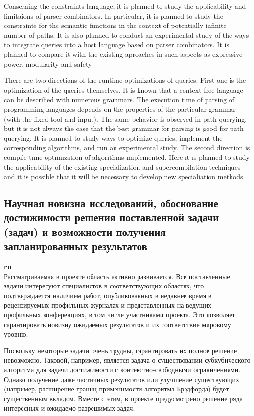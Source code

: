 \documentclass[12pt]{article}  %
\theoremstyle{remark}
\begin{document}
Conserning the constraints language, it is planned to study the applicability and limitaions of parser combinators.
In particular, it is planned to study the constraints for the semantic functions in the context of potentially infinite number of paths.
It is also planned to conduct an experimental study of the ways to integrate queries into a host language  based on parser combinators.
It is planned to compare it with the existing aproaches in such aspects as expressive power, modularity and safety.

There are two directions of the runtime optimizations of queries.
First one is the optimization of the queries themselves.
It is known that a context free language can be described with numerous grammars.
The execution time of parsing of programming languages depends on the properties of the particular grammar (with the fixed tool and input).
The same behavior is observed in path querying, but it is not always the case that the best grammar for parsing is good for path querying.
It is planned to study ways to optimize queries, implement the corresponding algorithms, and run an experimental study.
The second direction is compile-time optimization of algorithms implemented.
Here it is planned to study the applicability of the existing specialization and supercompilation techniques and it is possible that it will be necessary to develop new specialiation methods.


\subsection{Научная новизна исследований, обоснование достижимости решения поставленной задачи (задач) и возможности получения запланированных результатов}

\textbf{ru}\\
%
Рассматриваемая в проекте область активно развивается. Все поставленные задачи интересуют специалистов в соответствующих областях, что подтверждается наличием работ, опубликованных в недавнее время в рецензируемых профильных журналах и представленных на ведущих профильных конференциях, в том числе участниками проекта. Это позволяет гарантировать новизну ожидаемых результатов и их соответствие мировому уровню.

Поскольку некоторые задачи очень трудны, гарантировать их полное решение невозможно. Таковой, например, является задача о существовании субкубического алгоритма для задачи достижимости с контекстно-свободными ограничениями. Однако получение даже частичных результатов или улучшение существующих (например, расширение границ применимости алгоритма Брэдфорда) будет существенным вкладом. Вместе с этим, в проекте предусмотрено решение ряда интересных и ожидаемо разрешимых задач.
\end{document}
